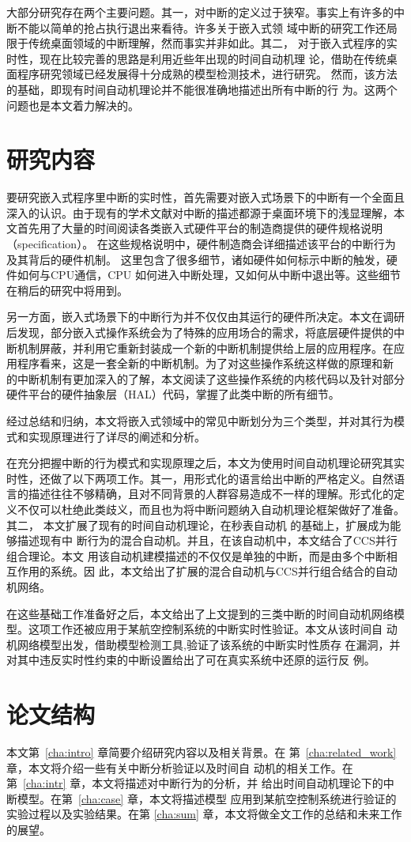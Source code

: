 大部分研究存在两个主要问题。其一，对中断的定义过于狭窄。事实上有许多的中
断不能以简单的抢占\pozhehao 执行\pozhehao 退出来看待。许多关于嵌入式领
域中断的研究工作还局限于传统桌面领域的中断理解，然而事实并非如此。其二，
对于嵌入式程序的实时性，现在比较完善的思路是利用近些年出现的时间自动机理
论，借助在传统桌面程序研究领域已经发展得十分成熟的模型检测技术，进行研究。
然而，该方法的基础，即现有时间自动机理论并不能很准确地描述出所有中断的行
为。这两个问题也是本文着力解决的。

\section{研究内容}
\label{sec:subject}

要研究嵌入式程序里中断的实时性，首先需要对嵌入式场景下的中断有一个全面且
深入的认识。由于现有的学术文献对中断的描述都源于桌面环境下的浅显理解，本
文首先用了大量的时间阅读各类嵌入式硬件平台的制造商提供的硬件规格说明（specification）。
在这些规格说明中，硬件制造商会详细描述该平台的中断行为及其背后的硬件机制。
这里包含了很多细节，诸如硬件如何标示中断的触发，硬件如何与CPU通信，CPU
如何进入中断处理，又如何从中断中退出等。这些细节在稍后的研究中将用到。

另一方面，嵌入式场景下的中断行为并不仅仅由其运行的硬件所决定。本文在调研
后发现，部分嵌入式操作系统会为了特殊的应用场合的需求，将底层硬件提供的中
断机制屏蔽，并利用它重新封装成一个新的中断机制提供给上层的应用程序。在应
用程序看来，这是一套全新的中断机制。为了对这些操作系统这样做的原理和新
的中断机制有更加深入的了解，本文阅读了这些操作系统的内核代码以及针对部分
硬件平台的硬件抽象层（HAL）代码，掌握了此类中断的所有细节。

经过总结和归纳，本文将嵌入式领域中的常见中断划分为三个类型，并对其行为模
式和实现原理进行了详尽的阐述和分析。

在充分把握中断的行为模式和实现原理之后，本文为使用时间自动机理论研究其实
时性，还做了以下两项工作。其一，用形式化的语言给出中断的严格定义。自然语
言的描述往往不够精确，且对不同背景的人群容易造成不一样的理解。形式化的定
义不仅可以杜绝此类歧义，而且也为将中断问题纳入自动机理论框架做好了准备。其二，
本文扩展了现有的时间自动机理论，在秒表自动机\cite{Abdeddaim:2002:PJS:646486.694487}
的基础上，扩展成为能够描述现有中
断行为的混合自动机。并且，在该自动机中，本文结合了CCS并行组合\cite{Milner:1989:CC:534666}理论。本文
用该自动机建模描述的不仅仅是单独的中断，而是由多个中断相互作用的系统。因
此，本文给出了扩展的混合自动机与CCS并行组合结合的自动机网络。

在这些基础工作准备好之后，本文给出了上文提到的三类中断的时间自动机网络模
型。这项工作还被应用于某航空控制系统的中断实时性验证。本文从该时间自
动机网络模型出发，借助模型检测工具\uppaal ,验证了该系统的中断实时性质存
在漏洞，并对其中违反实时性约束的中断设置给出了可在真实系统中还原的运行反
例。

\section{论文结构}
\label{sec:structure}
本文第~\ref{cha:intro} 章简要介绍研究内容以及相关背景。在
第~\ref{cha:related_work} 章，本文将介绍一些有关中断分析验证以及时间自
动机的相关工作。在第~\ref{cha:intr} 章，本文将描述对中断行为的分析，并
给出时间自动机理论下的中断模型。在第~\ref{cha:case} 章，本文将描述模型
应用到某航空控制系统进行验证的实验过程以及实验结果。在第
\ref{cha:sum} 章，本文将做全文工作的总结和未来工作的展望。



